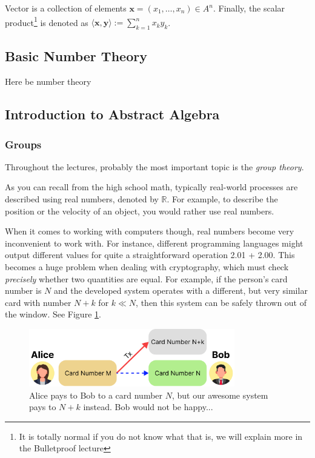 \documentclass[../lecture-notes.tex]{subfiles}
\begin{document}
Vector is a collection of elements $\mathbf{x} = (x_1,\dots,x_n) \in A^n$. Finally, the scalar product\footnote{It is totally normal if you do not know what that is, we will explain more in the Bulletproof lecture} is denoted as $\langle \mathbf{x}, \mathbf{y} \rangle := \sum_{k=1}^n x_ky_k$.

\subsection{Basic Number Theory}

Here be number theory

\subsection{Introduction to Abstract Algebra}


\subsubsection{Groups}

Throughout the lectures, probably the most important topic is the \textit{group theory}. 

As you can recall from the high school math, typically real-world processes are described using real numbers, denoted by $\mathbb{R}$. For example, to describe the position or the velocity of an object, you would rather use real numbers. 

When it comes to working with computers though, real numbers become very inconvenient to work with. For instance, different programming languages might output different values for quite a straightforward operation \textsf{2.01 + 2.00}. This becomes a huge problem when dealing with cryptography, which must check \textit{precisely} whether two quantities are equal. 
For example, if the person's card number is $N$ and the developed system operates with a different, but very similar card with number $N + k$ for $k \ll N$, then this system can be safely thrown out of the window. See Figure \ref{fig:why_integers}.

\begin{figure}
    \centering
    \includegraphics[width=0.8\textwidth]{images/lecture_1/why_integers.pdf}
    \caption{Alice pays to Bob to a card number $N$, but our awesome system pays to $N+k$ instead. Bob would not be happy...}
    \label{fig:why_integers}
\end{figure}
\end{document}
